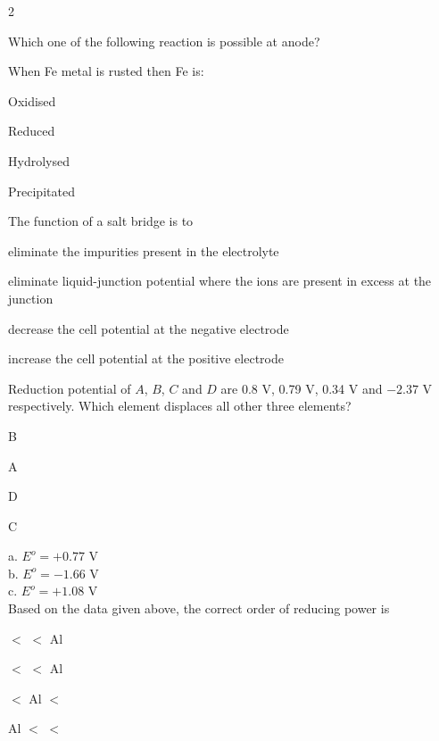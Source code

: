 \documentclass[10pt,a4paper]{article}
\begin{document}
\begin{multicols}{2}
\begin{questions}[start=138]

\item Which one of the following reaction is possible at anode?
\begin{options}
  \item {}
  \item {}
  \item {}
  \item {}
\end{options}

\item When Fe metal is rusted then Fe is:
\begin{options}
  \item Oxidised
  \item Reduced
  \item Hydrolysed
  \item Precipitated
\end{options}

\item The function of a salt bridge is to
\begin{options}
  \item eliminate the impurities present in the electrolyte
  \item eliminate liquid-junction potential where the ions are present in excess at the junction
  \item decrease the cell potential at the negative electrode
  \item increase the cell potential at the positive electrode
\end{options}

\item Reduction potential of $A$, $B$, $C$ and $D$ are 0.8 V, 0.79 V, 0.34 V and $-2.37$ V respectively. Which element displaces all other three elements?
\begin{options}
  \item B
  \item A
  \item D
  \item C
\end{options}

\item a.  \quad $E^o = +0.77$ V\\
b.  \quad $E^o = -1.66$ V\\
c.  \quad $E^o = +1.08$ V\\
Based on the data given above, the correct order of reducing power is
\begin{options}
  \item {} $<$  $<$ Al
  \item {} $<$  $<$ Al
  \item {} $<$ Al $<$ 
  \item Al $<$  $<$ 
\end{options}


\end{questions}
\end{multicols}
\end{document}
